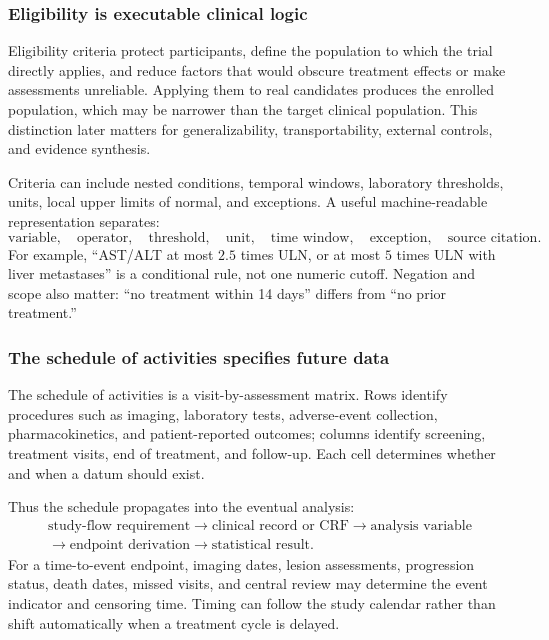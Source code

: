 \documentclass[12pt,oneside]{book}
\numberwithin{equation}{section}
\theoremstyle{definition}
\theoremstyle{plain}
\theoremstyle{remark}
\begin{document}
\subsubsection{Eligibility is executable clinical logic}

Eligibility criteria protect participants, define the population to which the
trial directly applies, and reduce factors that would obscure treatment effects
or make assessments unreliable.  Applying them to real candidates produces the
enrolled population, which may be narrower than the target clinical population.
This distinction later matters for generalizability, transportability,
external controls, and evidence synthesis.

Criteria can include nested conditions, temporal windows, laboratory
thresholds, units, local upper limits of normal, and exceptions.  A useful
machine-readable representation separates:
\[
 \text{variable},\quad \text{operator},\quad \text{threshold},\quad
 \text{unit},\quad \text{time window},\quad \text{exception},\quad
 \text{source citation}.
\]
For example, ``AST/ALT at most $2.5$ times ULN, or at most $5$ times ULN with
liver metastases'' is a conditional rule, not one numeric cutoff.  Negation and
scope also matter: ``no treatment within 14 days'' differs from ``no prior
treatment.''

\subsubsection{The schedule of activities specifies future data}

The schedule of activities is a visit-by-assessment matrix.  Rows identify
procedures such as imaging, laboratory tests, adverse-event collection,
pharmacokinetics, and patient-reported outcomes; columns identify screening,
treatment visits, end of treatment, and follow-up.  Each cell determines
whether and when a datum should exist.

Thus the schedule propagates into the eventual analysis:
\[
\begin{gathered}
 \text{study-flow requirement}\longrightarrow\text{clinical record or CRF}
 \longrightarrow\text{analysis variable}\\
 \longrightarrow\text{endpoint derivation}\longrightarrow
 \text{statistical result}.
\end{gathered}
\]
For a time-to-event endpoint, imaging dates, lesion assessments, progression
status, death dates, missed visits, and central review may determine the event
indicator and censoring time.  Timing can follow the study calendar rather than
shift automatically when a treatment cycle is delayed.
\end{document}
